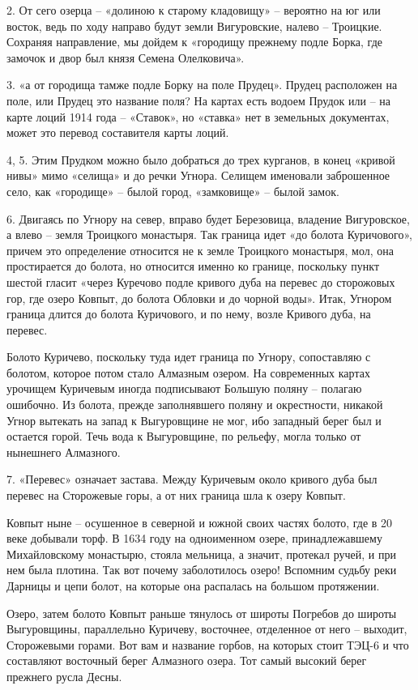 2. От сего озерца – «долиною к старому кладовищу» – вероятно на юг или восток, ведь по ходу направо будут земли Вигуровские, налево – Троицкие. Сохраняя направление, мы дойдем к «городищу прежнему подле Борка, где замочок и двор был князя Семена Олелковича».

3. «а от городища тамже подле Борку на поле Прудец». Прудец расположен на поле, или Прудец это название поля? На картах есть водоем Прудок или – на карте лоций 1914 года – «Ставок», но «ставка» нет в земельных документах, может это перевод составителя карты лоций.

4, 5. Этим Прудком можно было добраться до трех курганов, в конец «кривой нивы» мимо «селища» и до речки Угнора. Селищем именовали заброшенное село, как «городище» – былой город, «замковище» – былой замок.

6. Двигаясь по Угнору на север, вправо будет Березовица, владение Вигуровское, а влево – земля Троицкого монастыря. Так граница идет «до болота Куричового», причем это определение относится не к земле Троицкого монастыря, мол, она простирается до болота, но относится именно ко границе, поскольку пункт шестой гласит «через Куречово подле кривого дуба на перевес до сторожовых гор, где озеро Ковпыт, до болота Обловки и до чорной воды». Итак, Угнором граница длится до болота Куричового, и по нему, возле Кривого дуба, на перевес.

Болото Куричево, поскольку туда идет граница по Угнору, сопоставляю с болотом, которое потом стало Алмазным озером. На современных картах урочищем Куричевым иногда подписывают Большую поляну – полагаю ошибочно. Из болота, прежде заполнявшего поляну и окрестности, никакой Угнор вытекать на запад к Выгуровщине не мог, ибо западный берег был и остается горой. Течь вода к Выгуровщине, по рельефу, могла только от нынешнего Алмазного.

7. «Перевес» означает застава. Между Куричевым около кривого дуба был перевес на Сторожевые горы, а от них граница шла к озеру Ковпыт.

Ковпыт ныне – осушенное в северной и южной своих частях болото, где в 20 веке добывали торф. В 1634 году на одноименном озере, принадлежавшему Михайловскому монастырю, стояла мельница, а значит, протекал ручей, и при нем была плотина. Так вот почему заболотилось озеро! Вспомним судьбу реки Дарницы и цепи болот, на которые она распалась на большом протяжении. 

Озеро, затем болото Ковпыт раньше тянулось от широты Погребов до широты Выгуровщины, параллельно Куричеву, восточнее, отделенное от него – выходит, Сторожевыми горами. Вот вам и название горбов, на которых стоит ТЭЦ-6 и что составляют восточный берег Алмазного озера. Тот самый высокий берег прежнего русла Десны.

